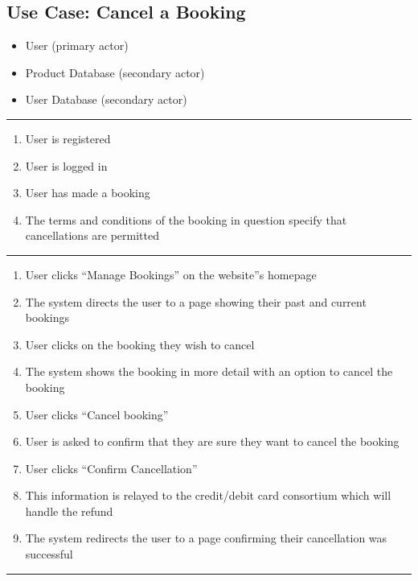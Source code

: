 \vspace{4ex}
\hspace{-4.2cm}
\begin{minipage}[h][][s]{\linewidth}
	\subsection{Use Case: Cancel a Booking}
\end{minipage}

\begin{itemize}
	\item User (primary actor)
	\item Product Database (secondary actor)
	\item User Database (secondary actor)
\end{itemize}
\noindent\rule{\textwidth}{0.6pt}

\begin{enumerate}
	\item User is registered
	\item User is logged in
	\item User has made a booking
	\item The terms and conditions of the booking in question specify that
		cancellations are permitted
\end{enumerate}
\noindent\rule{\textwidth}{0.6pt}

\begin{enumerate}
	\item User clicks ``Manage Bookings'' on the website''s homepage
	\item The system directs the user to a page showing their past and current
		bookings
	\item User clicks on the booking they wish to cancel
	\item The system shows the booking in more detail with an option to cancel
		the booking
	\item User clicks ``Cancel booking''
	\item User is asked to confirm that they are sure they want to cancel the
		booking
	\item User clicks ``Confirm Cancellation''
	\item This information is relayed to the credit/debit card consortium which
		will handle the refund
	\item The system redirects the user to a page confirming their cancellation
		was successful
\end{enumerate}
\noindent\rule{\textwidth}{0.6pt}

